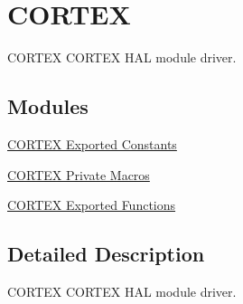 \hypertarget{group___c_o_r_t_e_x}{}\section{C\+O\+R\+T\+EX}
\label{group___c_o_r_t_e_x}


C\+O\+R\+T\+EX C\+O\+R\+T\+EX H\+AL module driver.  


\subsection*{Modules}
\begin{DoxyCompactItemize}
\item 
\hyperlink{group___c_o_r_t_e_x___exported___constants}{C\+O\+R\+T\+E\+X Exported Constants}
\item 
\hyperlink{group___c_o_r_t_e_x___private___macros}{C\+O\+R\+T\+E\+X Private Macros}
\item 
\hyperlink{group___c_o_r_t_e_x___exported___functions}{C\+O\+R\+T\+E\+X Exported Functions}
\end{DoxyCompactItemize}


\subsection{Detailed Description}
C\+O\+R\+T\+EX C\+O\+R\+T\+EX H\+AL module driver. 

